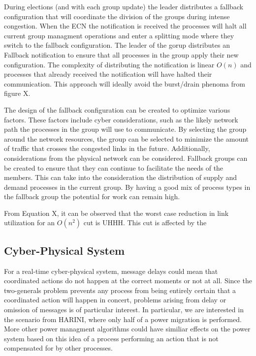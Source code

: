 During elections (and with each group update) the leader distributes a fallback configuration that will coordinate the division of the groups during intense congestion.
When the ECN the notification is received the processes will halt all current group managment operations and enter a splitting mode where they switch to the fallback configuration.
The leader of the gorup distributes an Fallback notification to ensure that all processes in the group apply their new configuration. 
The complexity of distributing the notification is linear $O(n)$ and processes that already received the notification will have halted their communication.
This approach will ideally avoid the burst/drain phenoma from figure X.

The design of the fallback configuration can be created to optimize various factors.
These factors include cyber considerations, such as the likely network path the processes in the group will use to communicate.
By selecting the group around the network resources, the group can be selected to minimize the amount of traffic that crosses the congested links in the future.
Additionally, considerations from the physical network can be considered.
Fallback groups can be created to ensure that they can continue to facilitate the needs of the members.
This can take into the consideration the distribution of supply and demand processes in the current group.
By having a good mix of process types in the fallback group the potential for work can remain high.

From Equation X, it can be observed that the worst case reduction in link utilization for an $O(n^2)$ cut is UHHH.
This cut is affected by the

\subsection{Cyber-Physical System}

For a real-time cyber-physical system, message delays could mean that coordinated actions do not happen at the correct moments or not at all.
Since the two-generals problem prevents any process from being entirely certain that a coordinated action will happen in concert, problems arising from delay or omission of messages is of particular interest.
In particular, we are interested in the scenario from HARINI, where only half of a power migration is performed.
More other power managment algorithms could have similiar effects on the power system based on this idea of a process performing an action that is not compensated for by other processes.

